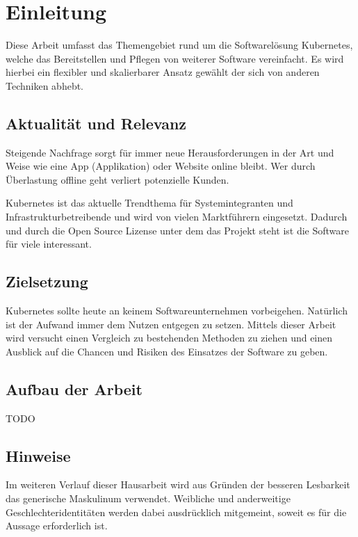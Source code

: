 \section{Einleitung}
Diese Arbeit umfasst das Themengebiet rund um die Softwarelösung Kubernetes, welche das Bereitstellen und Pflegen von weiterer Software vereinfacht. 
Es wird hierbei ein flexibler und skalierbarer Ansatz gewählt der sich von anderen Techniken abhebt.

\subsection{Aktualität und Relevanz}
Steigende Nachfrage sorgt für immer neue Herausforderungen in der Art und Weise wie eine App (Applikation) oder Website online bleibt. Wer durch Überlastung offline geht verliert potenzielle Kunden.

Kubernetes ist das aktuelle Trendthema für Systemintegranten und Infrastrukturbetreibende und wird von vielen Marktführern eingesetzt. Dadurch und durch die Open Source Lizense unter dem das Projekt steht
ist die Software für viele interessant.

\subsection{Zielsetzung}
Kubernetes sollte heute an keinem Softwareunternehmen vorbeigehen. Natürlich ist der Aufwand immer dem Nutzen entgegen zu setzen. Mittels dieser Arbeit wird versucht einen Vergleich zu 
bestehenden Methoden zu ziehen und einen Ausblick auf die Chancen und Risiken des Einsatzes der Software zu geben.

\subsection{Aufbau der Arbeit}
TODO

\subsection{Hinweise}
Im weiteren Verlauf dieser Hausarbeit wird aus Gründen der besseren Lesbarkeit das generische Maskulinum verwendet. Weibliche und anderweitige Geschlechteridentitäten werden dabei ausdrücklich mitgemeint, soweit es für die Aussage erforderlich ist.

